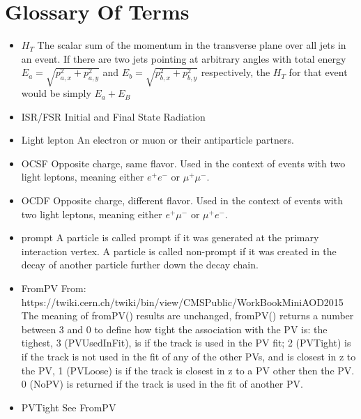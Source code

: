\chapter{Glossary Of Terms} \label{ch:glossary}

\begin{itemize}
\item{$H_T$} The scalar sum of the momentum in the transverse plane over all jets in an event. If there are two jets pointing at arbitrary angles with total energy $E_a=\sqrt{p_{a,x}^2 + p_{a,y}^2}$ and $E_b=\sqrt{p_{b,x}^2 + p_{b,y}^2}$ respectively, the $H_T$ for that event would be simply $E_a + E_B$

\item{ISR/FSR} Initial and Final State Radiation

\item{Light lepton} An electron or muon or their antiparticle partners.

\item{OCSF} Opposite charge, same flavor. Used in the context of events with two light leptons, meaning either $e^+e^-$ or $\mu^+ \mu^-$.

\item{OCDF} Opposite charge, different flavor. Used in the context of events with two light leptons, meaning either $e^+\mu^-$ or $\mu^+ e^-$.

\item{prompt} A particle is called prompt if it was generated at the primary interaction vertex. A particle is called non-prompt if it was created in the decay of another particle further down the decay chain. 

\item{FromPV} From: https://twiki.cern.ch/twiki/bin/view/CMSPublic/WorkBookMiniAOD2015 The meaning of fromPV() results are unchanged, fromPV() returns a number between 3 and 0 to define how tight the association with the PV is: 
the tighest, 3 (PVUsedInFit), is if the track is used in the PV fit;
2 (PVTight) is if the track is not used in the fit of any of the other PVs, and is closest in z to the PV,
1 (PVLoose) is if the track is closest in z to a PV other then the PV.
0 (NoPV) is returned if the track is used in the fit of another PV.

\item{PVTight} See FromPV

\end{itemize}
